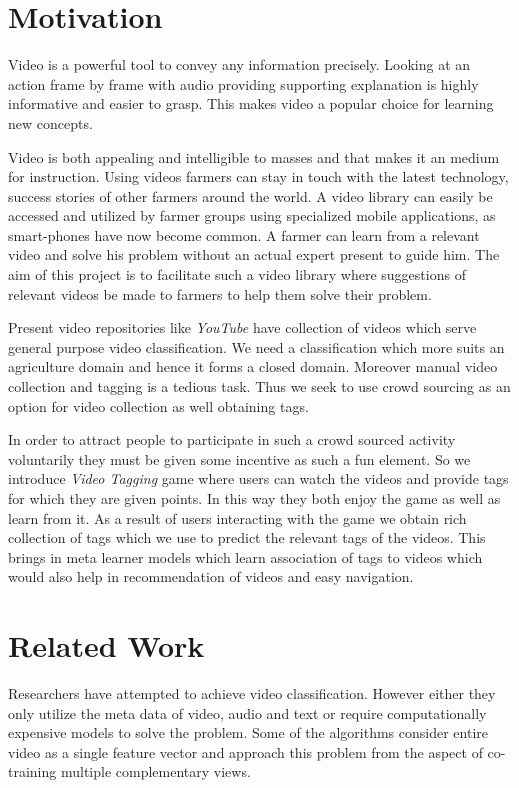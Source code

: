 \documentclass[12pt]{report}
\begin{document}
\section{Motivation}
Video is a powerful tool to convey any information precisely. Looking at an action frame by frame with audio providing supporting explanation is highly informative and easier to grasp. This makes video a popular choice for learning new concepts. 

Video is both appealing and intelligible to masses and that makes it an medium for instruction. Using videos farmers can stay in touch with the latest technology, success stories of other farmers around the world. A video library can easily be accessed and utilized by farmer groups using specialized mobile applications, as smart-phones have now become common. A farmer can learn from a relevant video and solve his problem without an actual expert present to guide him. The aim of this project is to facilitate such a video library where suggestions of relevant videos be made to farmers to help them solve their problem. 

Present video repositories like \emph{YouTube} have collection of videos which serve general purpose video classification. We need a classification which more suits an agriculture domain and hence it forms a closed domain. Moreover manual video collection and tagging is a tedious task. Thus we seek to use crowd sourcing as an option for video collection as well obtaining tags. 

In order to attract people to participate in such a crowd sourced activity voluntarily they must be given some incentive as such a fun element. So we introduce \emph{Video Tagging} game where users can watch the videos and provide tags for which they are given points. In this way they both enjoy the game as well as learn from it. As a result of users interacting with the game we obtain rich collection of tags which we use to predict the relevant tags of the videos. This brings in meta learner models which learn association of tags to videos which would also help in recommendation of videos and easy navigation.

\section{Related Work}
Researchers have attempted to achieve video classification. However either they only utilize the meta data of video, audio and text or require computationally expensive models to solve the problem. Some of the algorithms consider entire video as a single feature vector and approach
this problem from the aspect of co-training multiple complementary views.
\end{document}
